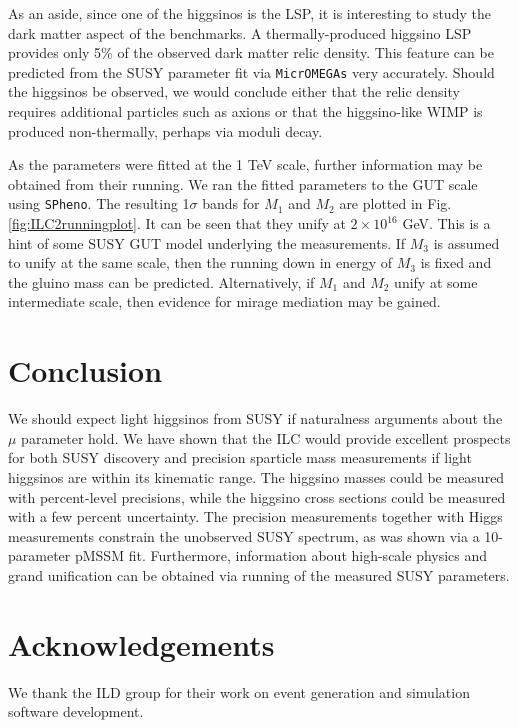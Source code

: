 \documentclass{PoS}
\begin{document}
As an aside, since one of the higgsinos is the LSP, 
it is interesting to study the dark matter aspect of the benchmarks. 
A thermally-produced higgsino LSP provides only 5\% of the observed dark matter relic density. 
This feature can be predicted from the SUSY parameter fit via \texttt{MicrOMEGAs} \cite{Belanger:2001fz} 
very accurately. 
Should the higgsinos be observed, we would conclude either that the relic density requires additional 
particles such as axions or that the higgsino-like WIMP is produced non-thermally, perhaps via moduli decay.

As the parameters were fitted at the 1 TeV scale, further information may be obtained from their running. 
We ran the fitted parameters to the GUT scale using \texttt{SPheno}. 
The resulting 1$\sigma$ bands for $M_1$ and $M_2$ are plotted in Fig. \ref{fig:ILC2runningplot}. 
It can be seen that they unify at $2\times 10^{16}$ GeV. 
This is a hint of some SUSY GUT model underlying the measurements. 
If $M_3$ is assumed to unify at the same scale, then the running down in energy of $M_3$ 
is fixed and the gluino mass can be predicted.
Alternatively, if $M_1$ and $M_2$ unify at some intermediate scale, then evidence for mirage mediation may be gained.




\section{Conclusion}

We should expect light higgsinos from SUSY if naturalness arguments about the $\mu$ parameter hold. 
We have shown that the ILC would provide excellent prospects for both SUSY discovery and 
precision sparticle mass measurements if light higgsinos are within its kinematic range. 
The higgsino masses could be measured with percent-level precisions, 
while the higgsino cross sections could be measured with a few percent uncertainty. 
The precision measurements together with Higgs measurements constrain the unobserved SUSY spectrum, 
as was shown via a 10-parameter pMSSM fit. 
Furthermore, information about high-scale physics and grand unification 
can be obtained via running of the measured SUSY parameters. 

\section*{Acknowledgements}

We thank the ILD group for their work on event generation and simulation software development.
\end{document}
